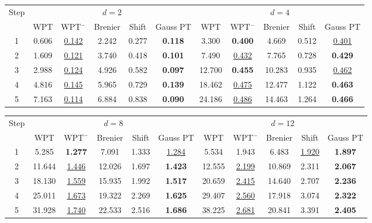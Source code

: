 \documentclass[11pt]{article}
\begin{document}
\begin{table}[h]
\centering
\small
\begin{tabular}{ccccccccccc}
\toprule
Step & \multicolumn{5}{c}{$d=2$} & \multicolumn{5}{c}{$d=4$} \\
\cmidrule(lr){2-6}\cmidrule(lr){7-11}
& WPT & WPT$^-$ & Brenier & Shift & Gauss PT & WPT & WPT$^-$ & Brenier & Shift & Gauss PT \\
\midrule
1 & 0.606 & \underline{0.142} & 2.242 & 0.277 & \textbf{0.118} & 3.300 & \textbf{0.400} & 4.669 & 0.512 & \underline{0.401} \\
2 & 1.609 & \underline{0.121} & 3.740 & 0.418 & \textbf{0.101} & 7.490 & \underline{0.432} & 7.765 & 0.728 & \textbf{0.429} \\
3 & 2.988 & \underline{0.124} & 4.926 & 0.582 & \textbf{0.097} & 12.700 & \textbf{0.455} & 10.283 & 0.935 & \underline{0.462} \\
4 & 4.816 & \underline{0.145} & 5.965 & 0.729 & \textbf{0.139} & 18.462 & \underline{0.475} & 12.477 & 1.122 & \textbf{0.463} \\
5 & 7.163 & \underline{0.114} & 6.884 & 0.838 & \textbf{0.090} & 24.186 & \underline{0.486} & 14.463 & 1.264 & \textbf{0.466} \\
\bottomrule
\end{tabular}

\vspace{0.7em}

\begin{tabular}{ccccccccccc}
\toprule
Step & \multicolumn{5}{c}{$d=8$} & \multicolumn{5}{c}{$d=12$} \\
\cmidrule(lr){2-6}\cmidrule(lr){7-11}
& WPT & WPT$^-$ & Brenier & Shift & Gauss PT & WPT & WPT$^-$ & Brenier & Shift & Gauss PT \\
\midrule
1 & 5.285 & \textbf{1.277} & 7.091 & 1.333 & \underline{1.284} & 5.534 & 1.943 & 6.483 & \underline{1.920} & \textbf{1.897} \\
2 & 11.644 & \underline{1.446} & 12.026 & 1.697 & \textbf{1.423} & 12.555 & \underline{2.199} & 10.869 & 2.311 & \textbf{2.067} \\
3 & 18.130 & \underline{1.559} & 15.935 & 1.992 & \textbf{1.517} & 20.659 & \underline{2.415} & 14.640 & 2.707 & \textbf{2.236} \\
4 & 25.011 & \underline{1.673} & 19.322 & 2.269 & \textbf{1.625} & 29.407 & \underline{2.560} & 17.918 & 3.074 & \textbf{2.322} \\
5 & 31.928 & \underline{1.740} & 22.533 & 2.516 & \textbf{1.686} & 38.225 & \underline{2.681} & 20.841 & 3.391 & \textbf{2.405} \\
\bottomrule
\end{tabular}


\end{table}
\end{document}
